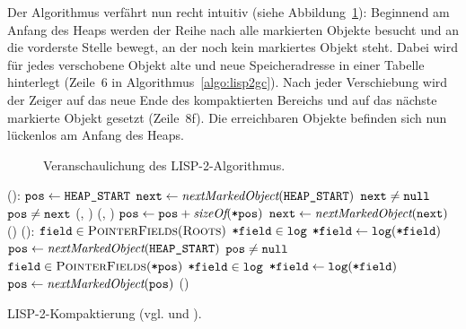 Der Algorithmus verfährt nun recht intuitiv (siehe Abbildung~\ref{fig:lisp2}):
Beginnend am Anfang des Heaps werden der Reihe nach alle markierten Objekte besucht und an die vorderste Stelle bewegt, an der noch kein markiertes Objekt steht.
Dabei wird für jedes verschobene Objekt alte und neue Speicheradresse in einer Tabelle  hinterlegt (Zeile~6 in Algorithmus~\ref{algo:lisp2gc}).
Nach jeder Verschiebung wird der Zeiger  auf das neue Ende des kompaktierten Bereichs und  auf das nächste markierte Objekt gesetzt (Zeile~8f).
Die erreichbaren Objekte befinden sich nun lückenlos am Anfang des Heaps.

\newpage

\begin{figure}[H]
	\centering
	
	\caption[LISP-2-Algorithmus]{Veranschaulichung des LISP-2-Algorithmus.}
	\label{fig:lisp2}
\end{figure}

\vfill

\begin{algorithm}[h!]
\begin{algorithmic}[1]
	\State \Atomic {}():
	\State \quad $\texttt{pos} \gets \texttt{HEAP\_START}$	
	\State \quad $\texttt{next} \gets \textit{nextMarkedObject}(\texttt{HEAP\_START})$ 
	\State \quad \WHILE $\texttt{next} \neq \texttt{null}$			
	\State \quad \quad \IF $\texttt{pos} \neq \texttt{next}$	
	\State \quad \quad \quad {}(, )		
	\State \quad \quad \quad {}(, )	
	\State \quad \quad $\texttt{pos} \gets \texttt{pos} + \textit{sizeOf}(\texttt{*pos})$	
	\State \quad \quad $\texttt{next} \gets \textit{nextMarkedObject}(\texttt{next})$
	\State \quad {}()
	\Statex
	\State {}():
	\State \quad \FOREACH $\texttt{field} \in \textsc{PointerFields}(\textsc{Roots})$
	\State \quad \quad \IF $\texttt{*field} \in \texttt{log}$ 
	\State \quad \quad \quad $\texttt{*field} \gets \texttt{log}(\texttt{*field})$
	\State \quad $\texttt{pos} \gets \textit{nextMarkedObject}(\texttt{HEAP\_START})$		
	\State \quad \WHILE $\texttt{pos} \neq \texttt{null}$
	\State \quad \quad \FOREACH $\texttt{field} \in \textsc{PointerFields}(\texttt{*pos})$
	\State \quad \quad \quad \IF $\texttt{*field} \in \texttt{log}$
	\State \quad \quad \quad \quad $\texttt{*field} \gets \texttt{log}(\texttt{*field})$
	\State \quad \quad $\texttt{pos} \gets \textit{nextMarkedObject}(\texttt{pos})$
	\State \quad {}()		
\end{algorithmic}
\caption[LISP-2-Kompaktierung]{LISP-2-Kompaktierung (vgl. \cite[S. 35]{handbook} und \cite[S. 7ff]{lisp2gc}).}
\label{algo:lisp2gc}
\end{algorithm}

